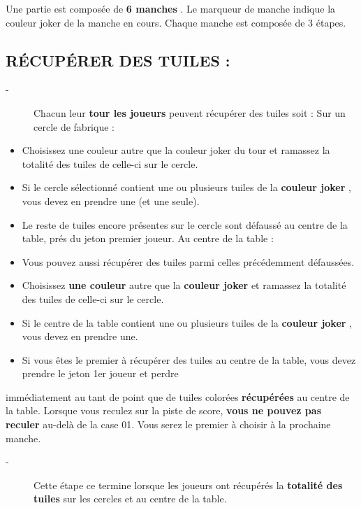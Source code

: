 \documentclass{scrartcl}%
\begin{document}
%
Une partie est composée de %
\textcolor{mygreen}{%
\textbf{6 manches}%
}%
. Le marqueur de manche indique la couleur joker de la manche en cours. Chaque manche est composée de 3 étapes.


%
\subsection{ RÉCUPÉRER DES TUILES :
}%
\label{subsec:RCUPRERDESTUILES}%
\begin{description}%
\item[{-} ]%
%
 Chacun leur %
\textcolor{mygreen}{%
\textbf{tour les joueurs}%
}%
\textit{ }%
 peuvent récupérer des tuiles soit : Sur un cercle de fabrique :
%
\end{description}%
\begin{itemize}%
\item%
%
 Choisissez une couleur autre que la couleur joker du tour et ramassez la totalité des tuiles de celle{-}ci sur le cercle.
%
\item%
%
 Si le cercle sélectionné contient une ou plusieurs tuiles de la %
\textcolor{mygreen}{%
\textbf{couleur joker}%
}%
, vous devez en prendre une (et une seule).
%
\item%
%
 Le reste de tuiles encore présentes sur le cercle sont défaussé au centre de la table, prés du jeton premier joueur. Au centre de la table :
%
\item%
%
 Vous pouvez aussi récupérer des tuiles parmi celles précédemment défaussées.
%
\item%
%
 Choisissez %
\textcolor{mygreen}{%
\textbf{une couleur}%
}%
\textit{ }%
 autre que la %
\textcolor{mygreen}{%
\textbf{couleur joker}%
}%
\textit{ }%
 et ramassez la totalité des tuiles de celle{-}ci sur le cercle.
%
\item%
%
 Si le centre de la table contient une ou plusieurs tuiles de la %
\textcolor{mygreen}{%
\textbf{couleur joker}%
}%
, vous devez en prendre une.
%
\item%
%
 Si vous êtes le premier à récupérer des tuiles au centre de la table, vous devez prendre le jeton 1er joueur et perdre
%
\end{itemize}%
immédiatement au tant de point que de tuiles colorées %
\textcolor{mygreen}{%
\textbf{récupérées}%
}%
\textit{ }%
 au centre de la table. Lorsque vous reculez sur la piste de score, %
\textcolor{mygreen}{%
\textbf{vous ne pouvez pas reculer}%
}%
\textit{ }%
 au{-}delà de la case 01. Vous serez le premier à choisir à la prochaine manche.
%
\begin{description}%
\item[{-} ]%
%
 Cette étape ce termine lorsque les joueurs ont récupérés la %
\textcolor{mygreen}{%
\textbf{totalité des tuiles}%
}%
\textit{ }%
 sur les cercles et au centre de la table.
%
\end{description}
\end{document}
